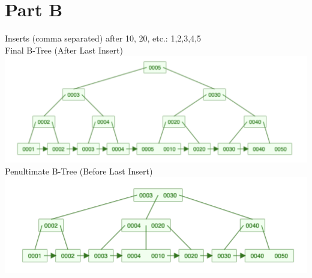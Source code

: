 \documentclass[12pt, letterpaper, fleqn]{article}
\begin{document}
  \section{Part B}
  Inserts (comma separated) after 10, 20, etc.: 1,2,3,4,5\\
  Final B-Tree (After Last Insert)\\
  \includegraphics[scale=1]{final_insert.png}
  Penultimate B-Tree (Before Last Insert)\\
  \includegraphics[scale=1]{penultimate_insert.png}
\end{document}
